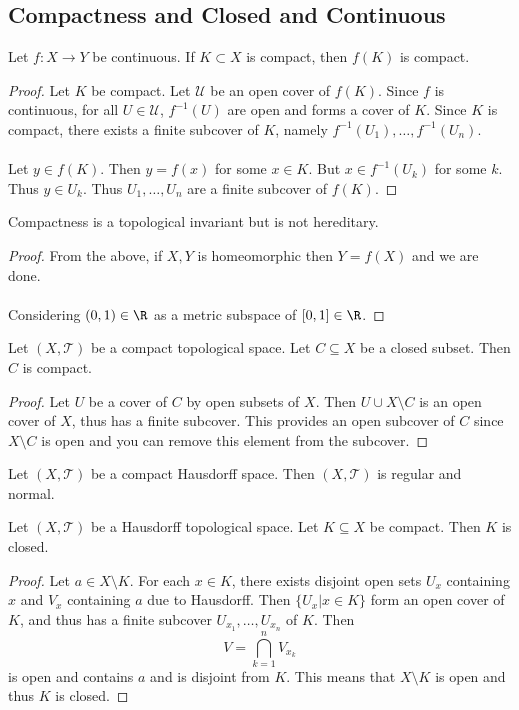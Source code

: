 \subsection{Compactness and Closed and Continuous}
\begin{prp}{}{} Let $f:X\to Y$ be continuous. If $K\subset X$ is compact, then $f(K)$ is compact.  \tcbline
\begin{proof}
Let $K$ be compact. Let $\mathcal{U}$ be an open cover of $f(K)$. Since $f$ is continuous, for all $U\in\mathcal{U}$, $f^{-1}(U)$ are open and forms a cover of $K$. Since $K$ is compact, there exists a finite subcover of $K$, namely $f^{-1}(U_1),\dots,f^{-1}(U_n)$. \\~\\
Let $y\in f(K)$. Then $y=f(x)$ for some $x\in K$. But $x\in f^{-1}(U_k)$ for some $k$. Thus $y\in U_k$. Thus $U_1,\dots,U_n$ are a finite subcover of $f(K)$. 
\end{proof}
\end{prp}

\begin{lmm}{}{} Compactness is a topological invariant but is not hereditary. \tcbline
\begin{proof}
From the above, if $X,Y$ is homeomorphic then $Y=f(X)$ and we are done. \\~\\
Considering $(0,1)\in\R$ as a metric subspace of $[0,1]\in\R$. 
\end{proof}
\end{lmm}

\begin{prp}{}{} Let $(X,\mathcal{T})$ be a compact topological space. Let $C\subseteq X$ be a closed subset. Then $C$ is compact. \tcbline
\begin{proof}
Let $U$ be a cover of $C$ by open subsets of $X$. Then $U\cup X\setminus C$ is an open cover of $X$, thus has a finite subcover. This provides an open subcover of $C$ since $X\setminus C$ is open and you can remove this element from the subcover. 
\end{proof}
\end{prp}

\begin{prp}{}{} Let $(X,\mathcal{T})$ be a compact Hausdorff space. Then $(X,\mathcal{T})$ is regular and normal. 
\end{prp}

\begin{prp}{}{} Let $(X,\mathcal{T})$ be a Hausdorff topological space. Let $K\subseteq X$ be compact. Then $K$ is closed. \tcbline
\begin{proof}
Let $a\in X\setminus K$. For each $x\in K$, there exists disjoint open sets $U_x$ containing $x$ and $V_x$ containing $a$ due to Hausdorff. Then $\{U_x|x\in K\}$ form an open cover of $K$, and thus has a finite subcover $U_{x_1},\dots,U_{x_n}$ of $K$. Then $$V=\bigcap_{k=1}^nV_{x_k}$$ is open and contains $a$ and is disjoint from $K$. This means that $X\setminus K$ is open and thus $K$ is closed. 
\end{proof}
\end{prp}

